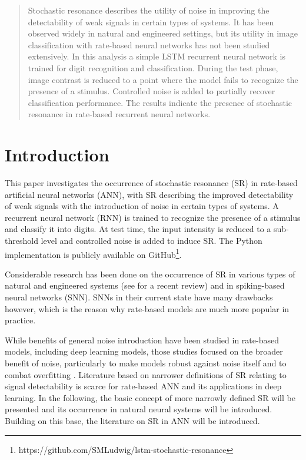 \documentclass{article}
\title{}
\author[1]{Siegfried M. Ludwig}
\affil[1]{\small{MSc Artificial Intelligence, Radboud University}}
\date{August 2019}
\begin{document}
\maketitle


\begin{abstract}
Stochastic resonance describes the utility of noise in improving the detectability of weak signals in certain types of systems. It has been observed widely in natural and engineered settings, but its utility in image classification with rate-based neural networks has not been studied extensively. In this analysis a simple LSTM recurrent neural network is trained for digit recognition and classification. During the test phase, image contrast is reduced to a point where the model fails to recognize the presence of a stimulus. Controlled noise is added to partially recover classification performance. The results indicate the presence of stochastic resonance in rate-based recurrent neural networks.
\end{abstract}



\section{Introduction}
This paper investigates the occurrence of stochastic resonance (SR) in rate-based artificial neural networks (ANN), with SR describing the improved detectability of weak signals with the introduction of noise in certain types of systems. A recurrent neural network (RNN) is trained to recognize the presence of a stimulus and classify it into digits. At test time, the input intensity is reduced to a sub-threshold level and controlled noise is added to induce SR. The Python implementation is publicly available on GitHub\footnote{https://github.com/SMLudwig/lstm-stochastic-resonance}.

Considerable research has been done on the occurrence of SR in various types of natural and engineered systems (see \cite{mcdonnell2009stochastic} for a recent review) and in spiking-based neural networks (SNN). SNNs in their current state have many drawbacks however, which is the reason why rate-based models are much more popular in practice.

While benefits of general noise introduction have been studied in rate-based models, including deep learning models, those studies focused on the broader benefit of noise, particularly to make models robust against noise itself and to combat overfitting \cite{saon2019sequence}. Literature based on narrower definitions of SR relating to signal detectability is scarce for rate-based ANN and its applications in deep learning. In the following, the basic concept of more narrowly defined SR will be presented and its occurrence in natural neural systems will be introduced. Building on this base, the literature on SR in ANN will be introduced.
\end{document}
